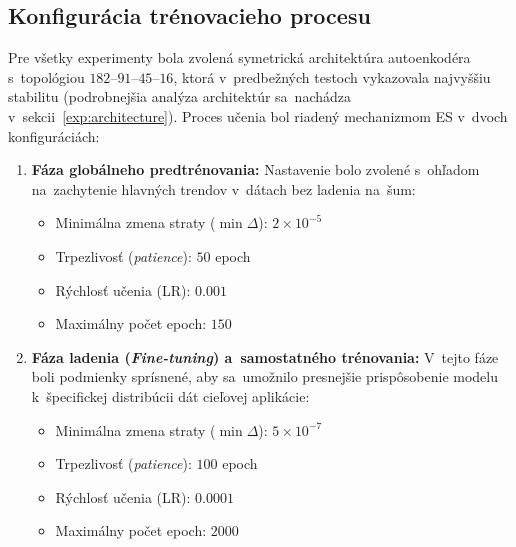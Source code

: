 \subsection{Konfigurácia trénovacieho procesu}
Pre všetky experimenty bola zvolená symetrická architektúra autoenkodéra s~topológiou $182\text{--}91\text{--}45\text{--}16$, ktorá v~predbežných testoch vykazovala najvyššiu stabilitu (podrobnejšia analýza architektúr sa~nachádza v~sekcii~\ref{exp:architecture}). Proces učenia bol riadený mechanizmom ES v~dvoch konfiguráciách:

\begin{enumerate}
    \item \textbf{Fáza globálneho predtrénovania:} 
    Nastavenie bolo zvolené s~ohľadom na~zachytenie hlavných trendov v~dátach bez ladenia na~šum:
    \begin{itemize}
        \item Minimálna zmena straty ($\min\Delta$): $2 \times 10^{-5}$
        \item Trpezlivosť (\textit{patience}): $50$ epoch
        \item Rýchlosť učenia (LR): $0.001$
        \item Maximálny počet epoch: $150$
    \end{itemize}
    
    \item \textbf{Fáza ladenia (\textit{Fine-tuning}) a~samostatného trénovania:} 
    V~tejto fáze boli podmienky sprísnené, aby sa~umožnilo presnejšie prispôsobenie modelu k~špecifickej distribúcii dát cieľovej aplikácie:
    \begin{itemize}
        \item Minimálna zmena straty ($\min\Delta$): $5 \times 10^{-7}$
        \item Trpezlivosť (\textit{patience}): $100$ epoch
        \item Rýchlosť učenia (LR): $0.0001$
        \item Maximálny počet epoch: $2000$
    \end{itemize}
\end{enumerate}

